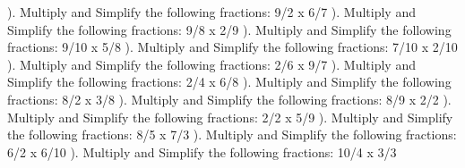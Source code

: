 \documentclass{article}%
\begin{document}
\newline%
\newline%
). Multiply and Simplify the following fractions: 9/2 x 6/7%
\newline%
\newline%
). Multiply and Simplify the following fractions: 9/8 x 2/9%
\newline%
\newline%
). Multiply and Simplify the following fractions: 9/10 x 5/8%
\newline%
\newline%
). Multiply and Simplify the following fractions: 7/10 x 2/10%
\newline%
\newline%
). Multiply and Simplify the following fractions: 2/6 x 9/7%
\newline%
\newline%
). Multiply and Simplify the following fractions: 2/4 x 6/8%
\newline%
\newline%
). Multiply and Simplify the following fractions: 8/2 x 3/8%
\newline%
\newline%
). Multiply and Simplify the following fractions: 8/9 x 2/2%
\newline%
\newline%
). Multiply and Simplify the following fractions: 2/2 x 5/9%
\newline%
\newline%
). Multiply and Simplify the following fractions: 8/5 x 7/3%
\newline%
\newline%
). Multiply and Simplify the following fractions: 6/2 x 6/10%
\newline%
\newline%
). Multiply and Simplify the following fractions: 10/4 x 3/3%
\newline%
\end{document}
